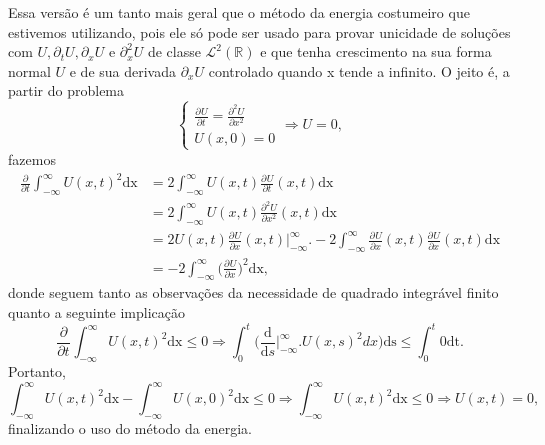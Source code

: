 \documentclass[../pde_notes.tex]{subfiles}
\begin{document}
Essa versão é um tanto mais geral que o método da energia costumeiro que estivemos utilizando, pois ele só pode ser usado para provar unicidade de soluções com \(U, \partial_t U, \partial_x U\) e \(\partial_{x}^{2}U\) de classe \(\mathcal{L}^{2}(\mathbb{R})\) e que tenha crescimento na sua forma normal \(U\) e de sua derivada \(\partial_x U\) controlado quando x tende a infinito. O jeito é, a partir do problema
\[
	\left\{\begin{array}{ll}
		\frac{\partial^{}U}{\partial t^{}} = \frac{\partial^{2}U}{\partial x^{2}} \\
		U(x, 0) = 0
	\end{array}\right. \Rightarrow U =0,
\]
fazemos
\begin{align*}
	\frac{\partial^{}}{\partial t^{}}\int_{-\infty}^{\infty}U(x, t)^{2} \mathrm{dx} & = 2 \int_{-\infty}^{\infty}U(x, t)\frac{\partial^{}U}{\partial t^{}}(x, t) \mathrm{dx}                                                                                                                      \\
	                                                                                & = 2\int_{-\infty}^{\infty}U(x, t)\frac{\partial^{2}U}{\partial x^{2}}(x, t) \mathrm{dx}                                                                                                                     \\
	                                                                                & = 2 U(x, t)\frac{\partial^{}U}{\partial x^{}}(x, t)\biggl|_{-\infty}^{\infty}\biggr. - 2\int_{-\infty}^{\infty}\frac{\partial^{}U}{\partial x^{}}(x, t)\frac{\partial^{}U}{\partial x^{}}(x, t) \mathrm{dx} \\
	                                                                                & = -2 \int_{-\infty}^{\infty}\biggl(\frac{\partial^{}U}{\partial x^{}}\biggr)^{2} \mathrm{dx},
\end{align*}
donde seguem tanto as observações da necessidade de quadrado integrável finito quanto a seguinte implicação
\[
	\frac{\partial^{}}{\partial t^{}}\int_{-\infty}^{\infty}U(x, t)^{2} \mathrm{dx}\leq 0 \Rightarrow \int_{0}^{t}\biggl(\frac{\mathrm{d}}{\mathrm{d}s}\biggl|_{-\infty}^{\infty}\biggr.U(x, s)^{2}dx\biggr) \mathrm{ds} \leq \int_{0}^{t}0 \mathrm{dt}.
\]
Portanto,
\[
	\int_{-\infty}^{\infty}U(x, t)^{2} \mathrm{dx} - \int_{-\infty}^{\infty}U(x, 0)^{2} \mathrm{dx} \leq 0 \Rightarrow \int_{-\infty}^{\infty}U(x, t)^{2} \mathrm{dx} \leq 0 \Rightarrow U(x, t) = 0,
\]
finalizando o uso do método da energia.
\end{document}
